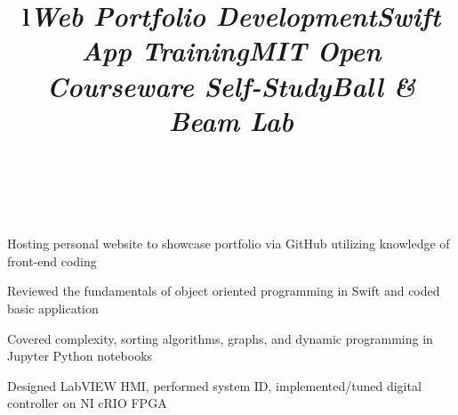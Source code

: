 \documentclass[mm]{res}
\begin{document}
\begin{resume}
\toprule

\section{\headingprojects}
\begin{format}
\title{l}\\
\body\\
\end{format}


\title{\textsl{Web Portfolio Development}}
\begin{position}
\tb Hosting personal website to showcase portfolio via GitHub utilizing knowledge of front-end coding
\end{position}

\title{\textsl{Swift App Training}}
\begin{position}
\tb Reviewed the fundamentals of object oriented programming in Swift and coded basic application
\end{position}


\title{\textsl{MIT Open Courseware Self-Study}}
\begin{position}
\tb Covered complexity, sorting algorithms, graphs, and dynamic programming in Jupyter Python notebooks
\end{position}


\title{\textsl{Ball \& Beam Lab}}
\begin{position}
\tb Designed LabVIEW HMI, performed system ID, implemented/tuned digital controller on NI cRIO FPGA
\end{position}


\end{resume}
\end{document}
